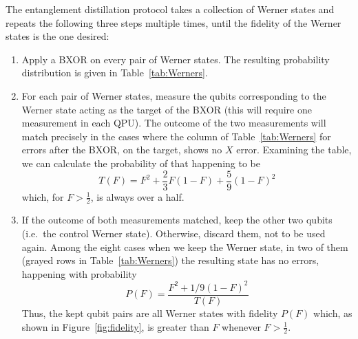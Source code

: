 The entanglement distillation protocol takes a collection of Werner states and repeats the following three steps multiple times, until the fidelity of the Werner states is the one desired:

\begin{enumerate}
  \item Apply a BXOR on every pair of Werner states. The resulting probability distribution is given in Table~\ref{tab:Werners}.

  \item For each pair of Werner states, measure the qubits corresponding to the Werner state acting as the target of the BXOR (this will require one measurement in each QPU). The outcome of the two measurements will match precisely in the cases where the column of Table~\ref{tab:Werners} for errors after the BXOR, on the target, shows no \(X\) error. Examining the table, we can calculate the probability of that happening to be \[T(F) = F^2 + \frac{2}{3} F(1-F) + \frac{5}{9} (1-F)^2\] which, for \(F > \frac{1}{2}\), is always over a half.

  \item If the outcome of both measurements matched, keep the other two qubits (i.e.\ the control Werner state). Otherwise, discard them, not to be used again. Among the eight cases when we keep the Werner state, in two of them (grayed rows in Table~\ref{tab:Werners}) the resulting state has no errors, happening with probability \[P(F) = \frac{F^2 + 1/9(1-F)^2}{T(F)}\] Thus, the kept qubit pairs are all Werner states with fidelity \(P(F)\) which, as shown in Figure~\ref{fig:fidelity}, is greater than \(F\) whenever \(F > \frac{1}{2}\).
\end{enumerate}

